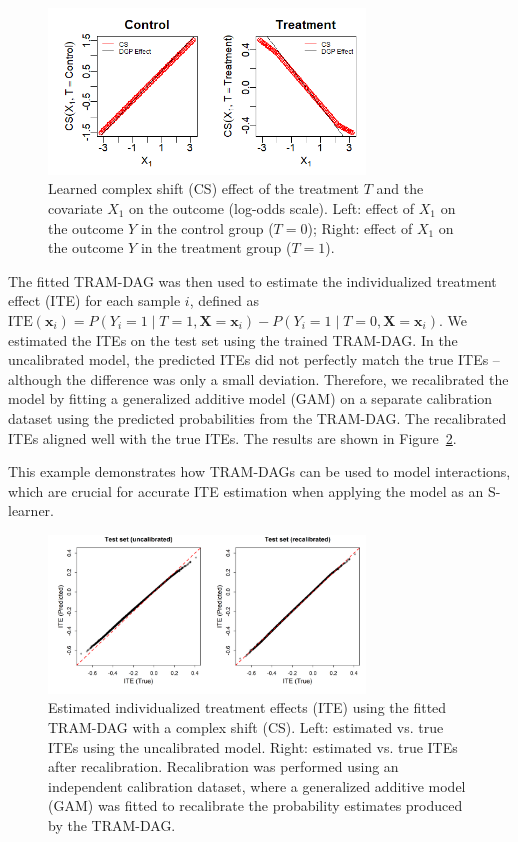 \begin{figure}[htbp]
\centering
\includegraphics[width=0.75\textwidth]{img/appendix_CS_T_X1_interaction.png}
\caption{Learned complex shift (CS) effect of the treatment $T$ and the covariate $X_1$ on the outcome (log-odds scale). Left: effect of $X_1$ on the outcome $Y$ in the control group ($T=0$); Right: effect of $X_1$ on the outcome $Y$ in the treatment group ($T=1$).}
\label{fig:CS_interaction}
\end{figure}


The fitted TRAM-DAG was then used to estimate the individualized treatment effect (ITE) for each sample $i$, defined as $\text{ITE}(\mathbf{x}_i) = P(Y_i = 1 \mid T = 1, \mathbf{X} = \mathbf{x}_i) - P(Y_i = 1 \mid T = 0, \mathbf{X} = \mathbf{x}_i)$. We estimated the ITEs on the test set using the trained TRAM-DAG. In the uncalibrated model, the predicted ITEs did not perfectly match the true ITEs -- although the difference was only a small deviation. Therefore, we recalibrated the model by fitting a generalized additive model (GAM) on a separate calibration dataset using the predicted probabilities from the TRAM-DAG. The recalibrated ITEs aligned well with the true ITEs. The results are shown in Figure~\ref{fig:ITE_interaction}.

This example demonstrates how TRAM-DAGs can be used to model interactions, which are crucial for accurate ITE estimation when applying the model as an S-learner.


\begin{figure}[htbp]
\centering
\includegraphics[width=0.75\textwidth]{img/appendix_ITE_recal.png}
\caption{Estimated individualized treatment effects (ITE) using the fitted TRAM-DAG with a complex shift (CS). Left: estimated vs. true ITEs using the uncalibrated model. Right: estimated vs. true ITEs after recalibration. Recalibration was performed using an independent calibration dataset, where a generalized additive model (GAM) was fitted to recalibrate the probability estimates produced by the TRAM-DAG.}
\label{fig:ITE_interaction}
\end{figure}



